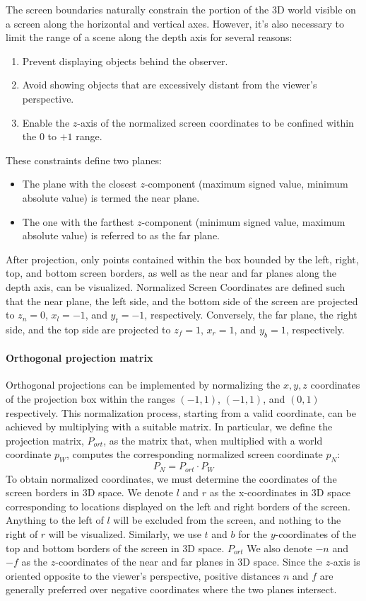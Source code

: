 The screen boundaries naturally constrain the portion of the 3D world visible on a screen along the horizontal and vertical axes. 
However, it's also necessary to limit the range of a scene along the depth axis for several reasons:
\begin{enumerate}
    \item Prevent displaying objects behind the observer.
    \item Avoid showing objects that are excessively distant from the viewer's perspective.
    \item Enable the $z$-axis of the normalized screen coordinates to be confined within the $0$ to $+1$ range.
\end{enumerate}
These constraints define two planes:
\begin{itemize}
    \item The plane with the closest $z$-component (maximum signed value, minimum absolute value) is termed the near plane.
    \item The one with the farthest $z$-component (minimum signed value, maximum absolute value) is referred to as the far plane.
\end{itemize}
After projection, only points contained within the box bounded by the left, right, top, and bottom screen borders, as well as the near and far planes along the depth axis, can be visualized.
Normalized Screen Coordinates are defined such that the near plane, the left side, and the bottom side of the screen are projected to $z_n=0$, $x_l=-1$, and $y_t=-1$, respectively. 
Conversely, the far plane, the right side, and the top side are projected to $z_f=1$, $x_r=1$, and $y_b=1$, respectively.

\paragraph*{Orthogonal projection matrix}
Orthogonal projections can be implemented by normalizing the $x, y, z$ coordinates of the projection box within the ranges $(-1,1)$, $(-1,1)$, and $(0,1)$ respectively. 
This normalization process, starting from a valid coordinate, can be achieved by multiplying with a suitable matrix.
In particular, we define the projection matrix, $P_{ort}$, as the matrix that, when multiplied with a world coordinate $p_W$, computes the corresponding normalized screen coordinate $p_N$: 
\[P_N=P_{ort}\cdot P_W\]
To obtain normalized coordinates, we must determine the coordinates of the screen borders in 3D space.
We denote $l$ and $r$ as the x-coordinates in 3D space corresponding to locations displayed on the left and right borders of the screen. 
Anything to the left of $l$ will be excluded from the screen, and nothing to the right of $r$ will be visualized. 
Similarly, we use $t$ and $b$ for the $y$-coordinates of the top and bottom borders of the screen in 3D space.
$P_{ort}$
We also denote $-n$ and $-f$ as the $z$-coordinates of the near and far planes in 3D space. 
Since the $z$-axis is oriented opposite to the viewer's perspective, positive distances $n$ and $f$ are generally preferred over negative coordinates where the two planes intersect.

